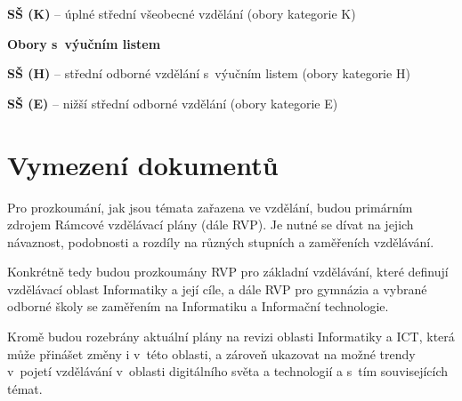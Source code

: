 \textbf{SŠ (K)} -- úplné střední všeobecné vzdělání (obory kategorie K)

\begin{displayquote}
 \citep{stredni-vzdelavani}
\end{displayquote}

\textbf{Obory s~výučním listem}

\textbf{SŠ (H)} -- střední odborné vzdělání s~výučním listem (obory kategorie H)

\begin{displayquote}
 \citep{stredni-vzdelavani}
\end{displayquote}

\textbf{SŠ (E)} -- nižší střední odborné vzdělání (obory kategorie E)

\begin{displayquote}
 \citep{stredni-vzdelavani}
\end{displayquote}

\section{Vymezení dokumentů}

Pro prozkoumání, jak jsou témata zařazena ve vzdělání, budou primárním zdrojem Rámcové vzdělávací plány (dále RVP). Je nutné se dívat na jejich návaznost, podobnosti a rozdíly na různých stupních a zaměřeních vzdělávání.

Konkrétně tedy budou prozkoumány RVP pro základní vzdělávání, které definují vzdělávací oblast Informatiky a její cíle, a dále RVP pro gymnázia a vybrané odborné školy se zaměřením na Informatiku a Informační technologie. 

Kromě budou rozebrány aktuální plány na revizi oblasti Informatiky a ICT, která může přinášet změny i v~této oblasti, a zároveň ukazovat na možné trendy v~pojetí vzdělávání v~oblasti digitálního světa a technologií a s~tím souvisejících témat.

